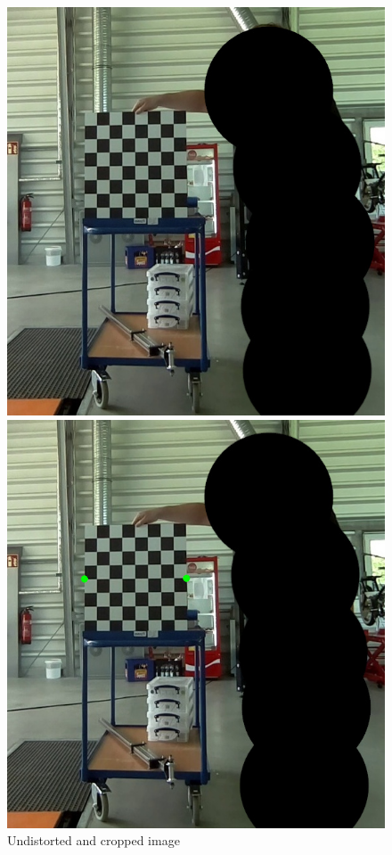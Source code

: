 \begin{figure}[H]
     \centering
     \captionsetup{justification=centering}
     \begin{minipage}[t]{0.5\textwidth}
        \centering
        \includegraphics[width=.95\textwidth]{image/2/250_undist_cropped.jpg}
        \caption{Undistorted and cropped image}
        \label{fig:250_og}
     \end{minipage}%
     \begin{minipage}[t]{0.5\textwidth}
        \centering
        \includegraphics[width=.95\textwidth]{image/2/250_undist_cropped_green.jpg}

\end{minipage}
\end{figure}
